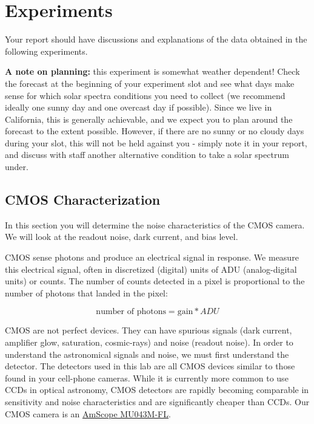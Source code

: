 \documentclass{../lab}
\begin{document}
\section{Experiments}

Your report should have discussions and explanations of the data obtained in the following experiments.

\textbf{A note on planning:} this experiment is somewhat weather dependent! Check the forecast at the beginning of your experiment slot and see what days make sense for which solar spectra conditions you need to collect (we recommend ideally one sunny day and one overcast day if possible). Since we live in California, this is generally achievable, and we expect you to plan around the forecast to the extent possible. However, if there are no sunny or no cloudy days during your slot, this will not be held against you - simply note it in your report, and discuss with staff another alternative condition to take a solar spectrum under.




\subsection{CMOS Characterization}
In this section you will determine the noise characteristics of the CMOS camera. We will look at the readout noise, dark current, and bias level. 


CMOS sense photons and produce an electrical signal in response. We measure this electrical signal, often in discretized (digital) units of ADU (analog-digital units) or counts. The number of counts detected in a pixel is proportional to the number of photons that landed in the pixel:

\begin{equation}
    \text{number of photons} = \text{gain}*ADU
    \label{eq:gain}
\end{equation}

CMOS are not perfect devices. They can have spurious signals (dark current, amplifier glow,
saturation, cosmic-rays) and noise (readout noise). In order to understand the astronomical signals
and noise, we must first understand the detector.
The detectors used in this lab are all CMOS devices similar to those found in your cell-phone
cameras. While it is currently more common to use CCDs in optical astronomy, CMOS detectors
are rapidly becoming comparable in sensitivity and noise characteristics and are significantly
cheaper than CCDs. Our CMOS camera is an \href{https://amscope.com/products/mu043m-fl?srsltid=AfmBOoraMNdLLKz4UvSt-a3ezDBTtJ4qwd5eWIXhwzeyAOOec2Dqhvwt}{AmScope MU043M-FL}.
\end{document}
